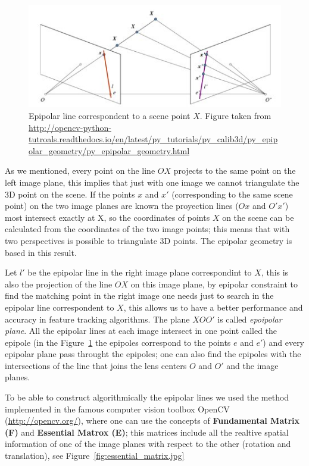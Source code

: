 \begin{figure}[h!]
\centering
\includegraphics[width = 1\textwidth]{./Diagrams/epipolar_line.jpg}
\caption{Epipolar line correspondent to a scene point $X$. Figure taken from \url{http://opencv-python-tutroals.readthedocs.io/en/latest/py_tutorials/py_calib3d/py_epipolar_geometry/py_epipolar_geometry.html}}
\label{epipolar_line}
\end{figure}

As we mentioned, every point on the line $OX$ projects to the same point on the left image plane, this implies that just with one image we cannot triangulate the 3D point on the scene. If the points $x$ and $x'$ (corresponding to the same scene point) on the two image planes are known the proyection lines ($Ox$ and $O'x'$) most intersect exactly at X, so the coordinates of points $X$ on the scene can be calculated from the coordinates of the two image points; this means that with two perspectives is possible to triangulate 3D points. The epipolar geometry is based in this result. 

\bigskip

Let $l'$ be the epipolar line in the right image plane correspondint to $X$, this is also the projection of the line $OX$ on this image plane, by epipolar constraint to find the matching point in the right image one needs just to search in the epipolar line correspondent to $X$, this allows us to have a better performance and accuracy in feature tracking algorithms. The plane $XOO'$ is called \textit{epoipolar plane}. All the epipolar lines at each image intersect in one point called the epipole (in the Figure~\ref{epipolar_line} the epipoles correspond to the points $e$ and $e'$) and every epipolar plane pass throught the epipoles; one can also find the epipoles with the intersections of the line that joins the lens centers $O$ and $O'$ and the image planes.

\bigskip

To be able to construct algorithmically the epipolar lines we used the method implemented in the famous computer vision toolbox OpenCV (\url{http://opencv.org/}), where one can use the concepts of \textbf{Fundamental Matrix (F)} and \textbf{Essential Matrox (E)}; this matrices include all the realtive spatial information of one of the image planes with respect to the other (rotation and translation), see Figure~\ref{fig:essential_matrix.jpg}

